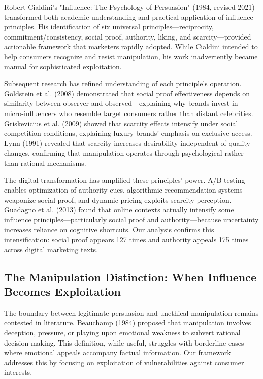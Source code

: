 Robert Cialdini's "Influence: The Psychology of Persuasion" (1984, revised 2021) transformed both academic understanding and practical application of influence principles. His identification of six universal principles—reciprocity, commitment/consistency, social proof, authority, liking, and scarcity—provided actionable framework that marketers rapidly adopted. While Cialdini intended to help consumers recognize and resist manipulation, his work inadvertently became manual for sophisticated exploitation.

Subsequent research has refined understanding of each principle's operation. Goldstein et al. (2008) demonstrated that social proof effectiveness depends on similarity between observer and observed—explaining why brands invest in micro-influencers who resemble target consumers rather than distant celebrities. Griskevicius et al. (2009) showed that scarcity effects intensify under social competition conditions, explaining luxury brands' emphasis on exclusive access. Lynn (1991) revealed that scarcity increases desirability independent of quality changes, confirming that manipulation operates through psychological rather than rational mechanisms.

The digital transformation has amplified these principles' power. A/B testing enables optimization of authority cues, algorithmic recommendation systems weaponize social proof, and dynamic pricing exploits scarcity perception. Guadagno et al. (2013) found that online contexts actually intensify some influence principles—particularly social proof and authority—because uncertainty increases reliance on cognitive shortcuts. Our analysis confirms this intensification: social proof appears 127 times and authority appeals 175 times across digital marketing texts.

\subsection{The Manipulation Distinction: When Influence Becomes Exploitation}

The boundary between legitimate persuasion and unethical manipulation remains contested in literature. Beauchamp (1984) proposed that manipulation involves deception, pressure, or playing upon emotional weakness to subvert rational decision-making. This definition, while useful, struggles with borderline cases where emotional appeals accompany factual information. Our framework addresses this by focusing on exploitation of vulnerabilities against consumer interests.


